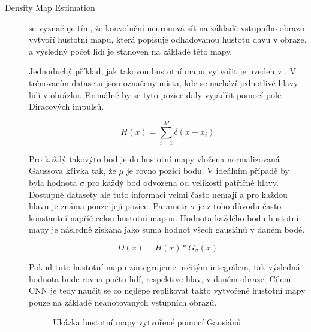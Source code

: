 \begin{description}
\item[Density Map Estimation] se vyznačuje tím, že konvoluční neuronová síť na základě vstupního obrazu vytvoří hustotní mapu, která popisuje odhadovanou hustotu davu v obraze, a výsledný počet lidí je stanoven na základě této mapy.

Jednoduchý příklad, jak takovou hustotní mapu vytvořit je uveden v \cite{DeepCorn, Boominathan}.
V trénovacím datasetu jsou označeny místa, kde se nachází jednotlivé hlavy lidí v obrázku.
Formálně by se tyto pozice daly vyjádřit pomocí pole Diracových impulsů.

\begin{equation}
H(x) = \sum_{i=1}^{M} \delta(x-x_i)
\label{eq:density_map}
\end{equation}


Pro každý takovýto bod je do hustotní mapy vložena normalizovaná Gaussova křivka tak, že \(\mu\) je rovno pozici bodu.
V ideálním případě by byla hodnota \(\sigma\) pro každý bod odvozena od velikosti patřičné hlavy.
Dostupné datasety ale tuto informaci velmi často nemají a pro každou hlavu je známa pouze její pozice.
Parametr \(\sigma\) je z toho důvodu často konstantní napříč celou hustotní mapou.
Hodnota každého bodu hustotní mapy je následně získána jako suma hodnot všech gausiánů v daném bodě.

\begin{equation}
D(x) = H(x) * G_{\sigma}(x)
\label{eq:density_map}
\end{equation}

Pokud tuto hustotní mapu zintegrujeme určitým integrálem, tak výsledná hodnota bude rovna počtu lidí, respektive hlav, v daném obraze.
Cílem CNN je tedy naučit se co nejlépe replikovat takto vytvořené hustotní mapy pouze na základě neanotovaných vstupních obrazů.

\begin{figure}[h!]
	\centering
	\caption{Ukázka hustotní mapy vytvořené pomocí Gausiánů}
\end{figure}


\end{description}
